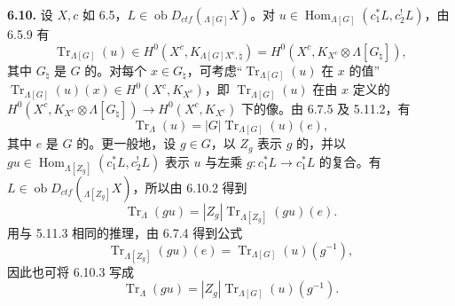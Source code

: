 \textbf{6.10.} 设 $X,c$ 如 6.5，$L\in\operatorname{ob}D_{ctf}({}_{\Lambda[G]}X)$。对 $u\in\operatorname{Hom}_{\Lambda[G]}(c_1^*L,c_2^!L)$，由 6.5.9 有
\begin{equation}\operatorname{Tr}_{\Lambda[G]}(u)\in H^0(X^c,K_{\Lambda[G]X^c,\natural})=H^0(X^c,K_{X^c}\otimes\Lambda[G_\natural]),\tag{6.10.1}\end{equation}
其中 $G_\natural$ 是 $G$ 的。对每个 $x\in G_\natural$，可考虑“$\operatorname{Tr}_{\Lambda[G]}(u)$ 在 $x$ 的值”$\operatorname{Tr}_{\Lambda[G]}(u)(x)\in H^0(X^c,K_{X^c})$，即 $\operatorname{Tr}_{\Lambda[G]}(u)$ 在由 $x$ 定义的 $H^0(X^c,K_{X^c}\otimes\Lambda[G_\natural])\to H^0(X^c,K_{X^c})$ 下的像。由 6.7.5 及 5.11.2，有
\begin{equation}\operatorname{Tr}_\Lambda(u)=|G|\operatorname{Tr}_{\Lambda[G]}(u)(e),\tag{6.10.2}\end{equation}
其中 $e$ 是 $G$ 的。更一般地，设 $g\in G$，以 $Z_g$ 表示 $g$ 的，并以 $gu\in\operatorname{Hom}_{\Lambda[Z_g]}(c_1^*L,c_2^!L)$ 表示 $u$ 与左乘 $g:c_1^*L\to c_1^*L$ 的复合。有 $L\in\operatorname{ob}D_{ctf}({}_{\Lambda[Z_g]}X)$，所以由 6.10.2 得到
\begin{equation}\operatorname{Tr}_\Lambda(gu)=|Z_g|\operatorname{Tr}_{\Lambda[Z_g]}(gu)(e).\tag{6.10.3}\end{equation}
用与 5.11.3 相同的推理，由 6.7.4 得到公式
\begin{equation}\operatorname{Tr}_{\Lambda[Z_g]}(gu)(e)=\operatorname{Tr}_{\Lambda[G]}(u)(g^{-1}),\tag{6.10.4}\end{equation}
因此也可将 6.10.3 写成
\begin{equation}\operatorname{Tr}_\Lambda(gu)=|Z_g|\operatorname{Tr}_{\Lambda[G]}(u)(g^{-1}).\tag{6.10.5}\end{equation}

